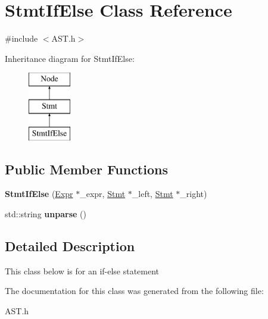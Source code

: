 \hypertarget{classStmtIfElse}{\section{Stmt\-If\-Else Class Reference}
\label{classStmtIfElse}
}


{\ttfamily \#include $<$A\-S\-T.\-h$>$}

Inheritance diagram for Stmt\-If\-Else\-:\begin{figure}[H]
\begin{center}
\leavevmode
\includegraphics[height=3.000000cm]{classStmtIfElse}
\end{center}
\end{figure}
\subsection*{Public Member Functions}
\begin{DoxyCompactItemize}
\item 
\hypertarget{classStmtIfElse_ae2f0b979cf81a33f9e14fe66d160d566}{{\bfseries Stmt\-If\-Else} (\hyperlink{classExpr}{Expr} $\ast$\-\_\-expr, \hyperlink{classStmt}{Stmt} $\ast$\-\_\-left, \hyperlink{classStmt}{Stmt} $\ast$\-\_\-right)}\label{classStmtIfElse_ae2f0b979cf81a33f9e14fe66d160d566}

\item 
\hypertarget{classStmtIfElse_a276e62a0a9f70ba8e50b0e1d080265a8}{std\-::string {\bfseries unparse} ()}\label{classStmtIfElse_a276e62a0a9f70ba8e50b0e1d080265a8}

\end{DoxyCompactItemize}


\subsection{Detailed Description}
This class below is for an if-\/else statement 

The documentation for this class was generated from the following file\-:\begin{DoxyCompactItemize}
\item 
A\-S\-T.\-h\end{DoxyCompactItemize}
